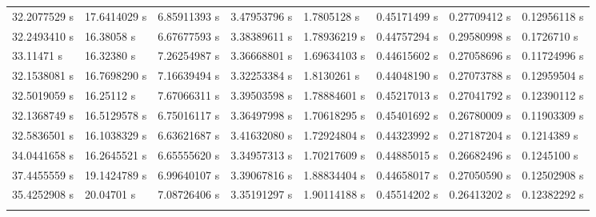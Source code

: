 \begin{landscape}
\begin{longtable}{llllllll}
    32.2077529 s& 17.6414029 s& 6.85911393 s& 3.47953796 s& 1.7805128 s & 0.45171499 s& 0.27709412 s& 0.12956118 s\\
    32.2493410 s& 16.38058 s  & 6.67677593 s& 3.38389611 s& 1.78936219 s& 0.44757294 s& 0.29580998 s& 0.1726710 s \\
    33.11471 s  & 16.32380 s  & 7.26254987 s& 3.36668801 s& 1.69634103 s& 0.44615602 s& 0.27058696 s& 0.11724996 s\\
    32.1538081 s& 16.7698290 s& 7.16639494 s& 3.32253384 s& 1.8130261 s & 0.44048190 s& 0.27073788 s& 0.12959504 s\\
    32.5019059 s& 16.25112 s  & 7.67066311 s& 3.39503598 s& 1.78884601 s& 0.45217013 s& 0.27041792 s& 0.12390112 s\\
    32.1368749 s& 16.5129578 s& 6.75016117 s& 3.36497998 s& 1.70618295 s& 0.45401692 s& 0.26780009 s& 0.11903309 s\\
    32.5836501 s& 16.1038329 s& 6.63621687 s& 3.41632080 s& 1.72924804 s& 0.44323992 s& 0.27187204 s& 0.1214389 s \\
    34.0441658 s& 16.2645521 s& 6.65555620 s& 3.34957313 s& 1.70217609 s& 0.44885015 s& 0.26682496 s& 0.1245100 s \\
    37.4455559 s& 19.1424789 s& 6.99640107 s& 3.39067816 s& 1.88834404 s& 0.44658017 s& 0.27050590 s& 0.12502908 s\\
    35.4252908 s& 20.04701 s  & 7.08726406 s& 3.35191297 s& 1.90114188 s& 0.45514202 s& 0.26413202 s& 0.12382292 s\\
    \label{table:instrumented_amount_benchmark}
  \end{longtable}
\end{landscape}
